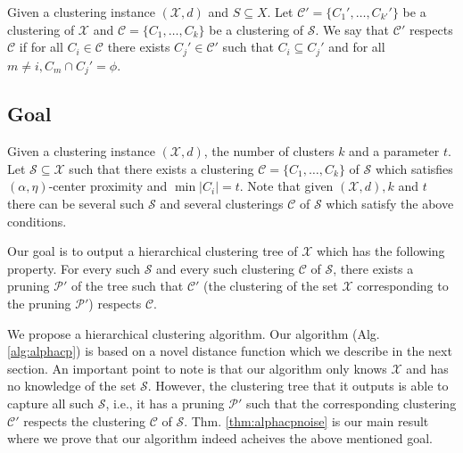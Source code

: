 \documentclass[11pt]{article}
\newcommand{\mc}{\mathcal}
\begin{document}
\begin{definition}[$\mc C'$ respects $\mc C$] Given a clustering instance $(\mc X, d)$ and $S \subseteq X$. Let $\mc C' = \{C_1', \ldots, C_{k'}'\}$ be a clustering of $\mc X$ and $\mc C = \{C_1, \ldots, C_k\}$ be a clustering of $\mc S$. We say that $\mc C'$ respects $\mc C$ if for all $C_i \in \mc C$ there exists $C_j' \in \mc C'$ such that $C_i \subseteq C_j'$ and for all $m \neq i, C_m \cap C_j' = \phi$.
\end{definition}

\subsection{Goal}
Given a clustering instance $(\mc X, d)$, the number of clusters $k$ and a parameter $t$. Let $\mc S \subseteq \mc X$ such that there exists a clustering $\mc C =\{C_1, \ldots, C_k\}$ of $\mc S$ which satisfies $(\alpha, \eta)$-center proximity and $\min |C_i| = t$. Note that given $(\mc X, d), k$ and $t$ there can be several such $\mc S$ and several clusterings $\mc C$ of $\mc S$ which satisfy the above conditions. 

Our goal is to output a hierarchical clustering tree of $\mc X$ which has the following property. For every such $\mc S$ and every such clustering $\mc C$ of $\mc S$, there exists a pruning $\mc P'$ of the tree such that $\mc C'$ (the clustering of the set $\mc X$ corresponding to the pruning $\mc P'$) respects $\mc C$. 

We propose a hierarchical clustering algorithm. Our algorithm (Alg. \ref{alg:alphacp}) is based on a novel distance function which we describe in the next section. An important point to note is that our algorithm only knows $\mc X$ and has no knowledge of the set $\mc S$. However, the clustering tree that it outputs is able to capture all such $\mc S$, i.e., it has a pruning $\mc P'$ such that the corresponding clustering $\mc C'$ respects the clustering $\mc C$ of $\mc S$. Thm. \ref{thm:alphacpnoise} is our main result where we prove that our algorithm indeed acheives the above mentioned goal.

\end{document}
